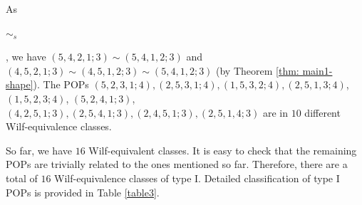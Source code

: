 \documentclass[12pt, english, a4paper]{article}
\theoremstyle{plain}
\theoremstyle{definition}
\theoremstyle{remark}
\begin{document}
As  $\sim_s$ , we have $(5,4,2,1;3)\sim (5,4,1,2;3)$ and $ (4,5,2,1;3)\sim (4,5,1,2;3)\sim (5,4,1,2;3)$ (by Theorem \ref{thm: main1-shape}).   
The POPs $(5,2,3,1;4), (2,5,3,1;4),  (1,5,3,2;4),  (2,5,1,3;4)$, $ (1,5,2,3;4)$, $(5,2,4,1;3)$, $(4,2,5,1;3), (2,5,4,1;3), (2,4,5,1;3), (2,5,1,4;3)$ are in $10$ different Wilf-equivalence classes.

    So far, we have $16$ Wilf-equivalent classes. It is easy to check that the remaining POPs are trivially related to the ones mentioned so far. Therefore, there are a total of $16$ Wilf-equivalence classes of type I. Detailed classification of type I POPs is provided in Table \ref{table3}.
\end{document}

